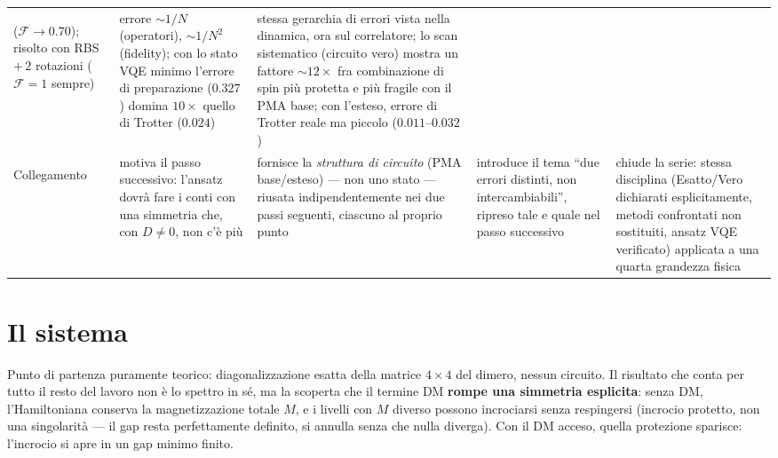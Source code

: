 \documentclass[11pt,a4paper]{article}
\begin{document}
\begin{landscape}
\begin{center}
\begin{tabular}{@{}>{\bfseries\raggedright}p{2.7cm} p{5.15cm} p{5.15cm} p{5.15cm} p{5.15cm}@{}}
($\mathcal F\to0.70$); risolto con RBS $+\,2$ rotazioni ($\mathcal F=1$
sempre) &
errore $\sim1/N$ (operatori), $\sim1/N^2$ (fidelity); con lo stato VQE
minimo l'errore di preparazione ($0.327$) domina $10\times$ quello di
Trotter ($0.024$) &
stessa gerarchia di errori vista nella dinamica, ora sul correlatore; lo
scan sistematico (circuito vero) mostra un fattore $\sim12\times$ fra
combinazione di spin più protetta e più fragile con il PMA base; con
l'esteso, errore di Trotter reale ma piccolo ($0.011$--$0.032$) \\
\addlinespace
Collegamento &
motiva il passo successivo: l'ansatz dovrà fare i conti con una
simmetria che, con $D\neq0$, non c'è più &
fornisce la \emph{struttura di circuito} (PMA base/esteso) --- non uno
stato --- riusata indipendentemente nei due passi seguenti, ciascuno al
proprio punto &
introduce il tema ``due errori distinti, non intercambiabili'', ripreso
tale e quale nel passo successivo &
chiude la serie: stessa disciplina (Esatto/Vero dichiarati esplicitamente,
metodi confrontati non sostituiti, ansatz VQE verificato) applicata a una
quarta grandezza fisica \\
\bottomrule
\end{tabular}
\end{center}
\end{landscape}

\clearpage

\section{Il sistema}

Punto di partenza puramente teorico: diagonalizzazione esatta della
matrice $4\times4$ del dimero, nessun circuito. Il risultato che conta per
tutto il resto del lavoro non è lo spettro in sé, ma la scoperta che il
termine DM \textbf{rompe una simmetria esplicita}: senza DM,
l'Hamiltoniana conserva la magnetizzazione totale $M$, e i livelli con $M$
diverso possono incrociarsi senza respingersi (incrocio protetto, non una
singolarità --- il gap resta perfettamente definito, si annulla senza che
nulla diverga). Con il DM acceso, quella protezione sparisce: l'incrocio
si apre in un gap minimo finito.

\end{document}
